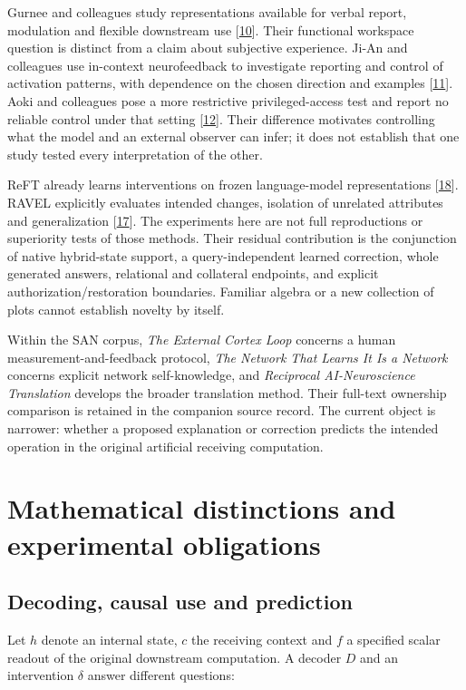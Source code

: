 \documentclass[11pt,letterpaper]{article}
\begin{document}
Gurnee and colleagues study representations available for verbal report, modulation and flexible downstream use [\hyperref[ref:10]{10}]. Their functional workspace question is distinct from a claim about subjective experience. Ji-An and colleagues use in-context neurofeedback to investigate reporting and control of activation patterns, with dependence on the chosen direction and examples [\hyperref[ref:11]{11}]. Aoki and colleagues pose a more restrictive privileged-access test and report no reliable control under that setting [\hyperref[ref:12]{12}]. Their difference motivates controlling what the model and an external observer can infer; it does not establish that one study tested every interpretation of the other.

ReFT already learns interventions on frozen language-model representations [\hyperref[ref:18]{18}]. RAVEL explicitly evaluates intended changes, isolation of unrelated attributes and generalization [\hyperref[ref:17]{17}]. The experiments here are not full reproductions or superiority tests of those methods. Their residual contribution is the conjunction of native hybrid-state support, a query-independent learned correction, whole generated answers, relational and collateral endpoints, and explicit authorization/restoration boundaries. Familiar algebra or a new collection of plots cannot establish novelty by itself.

Within the SAN corpus, \emph{The External Cortex Loop} concerns a human measurement-and-feedback protocol, \emph{The Network That Learns It Is a Network} concerns explicit network self-knowledge, and \emph{Reciprocal AI-Neuroscience Translation} develops the broader translation method. Their full-text ownership comparison is retained in the companion source record. The current object is narrower: whether a proposed explanation or correction predicts the intended operation in the original artificial receiving computation.

\section{Mathematical distinctions and experimental obligations}

\subsection{Decoding, causal use and prediction}

Let \(h\) denote an internal state, \(c\) the receiving context and \(f\) a specified scalar readout of the original downstream computation. A decoder \(D\) and an intervention \(\delta\) answer different questions:
\end{document}
